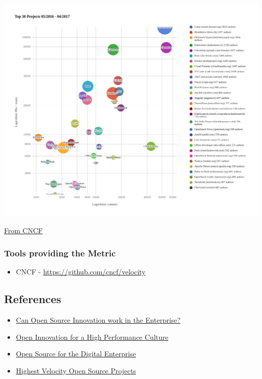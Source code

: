 \includegraphics{images/project-velocity_visualization.png}

\href{https://www.cncf.io/blog/2017/06/05/30-highest-velocity-open-source-projects/}{From
CNCF}

\hypertarget{tools-providing-the-metric}{%
\subsubsection{Tools providing the
Metric}\label{tools-providing-the-metric}}

\begin{itemize}
\tightlist
\item
  CNCF - \url{https://github.com/cncf/velocity}
\end{itemize}

\hypertarget{references}{%
\subsection{References}\label{references}}

\begin{itemize}
\tightlist
\item
  \href{https://www.threefivetwo.com/blog/can-open-source-innovation-work-in-the-enterprise}{Can
  Open Source Innovation work in the Enterprise?}
\item
  \href{https://www.nearform.com/blog/want-a-high-performing-culture-make-way-for-open-innovation}{Open
  Innovation for a High Performance Culture}
\item
  \href{https://www.cio.com/article/3213146/open-source-is-powering-the-digital-enterprise.html}{Open
  Source for the Digital Enterprise}
\item
  \href{https://www.cncf.io/blog/2017/06/05/30-highest-velocity-open-source-projects}{Highest
  Velocity Open Source Projects}
\end{itemize}
